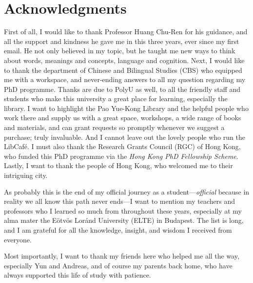 \chapter*{Acknowledgments}
\label{ch:acknowledgments}


First of all, I would like to thank Professor Huang Chu-Ren for his guidance, and all the support and kindness he gave me in this three years, ever since my first email. He not only believed in my topic, but he taught me new ways to think about words, meanings and concepts, language and cognition. Next, I would like to thank the department of Chinese and Bilingual Studies (CBS) who equipped me with a workspace, and never-ending answers to all my question regarding my PhD programme. Thanks are due to PolyU as well, to all the friendly staff and students who make this university a great place for learning, especially the library. I want to highlight the Pao Yue-Kong Library and the helpful people who work there and supply us with a great space, workshops, a wide range of books and materials, and can grant requests so promptly whenever we suggest a purchase; truly invaluable. And I cannot leave out the lovely people who run the LibCafé. I must also thank the Research Grants Council (RGC) of Hong Kong, who funded this PhD programme via the \textit{Hong Kong PhD Fellowship Scheme}. Lastly, I want to thank the people of Hong Kong, who welcomed me to their intriguing city.


As probably this is the end of my official journey as a student---\textit{official} because in reality we all know this path never ends---I want to mention my teachers and professors who I learned so much from throughout these years, especially at my alma mater the Eötvös Loránd University (ELTE) in Budapest. The list is long, and I am grateful for all the knowledge, insight, and wisdom I received from everyone.


Most importantly, I want to thank my friends here who helped me all the way, especially Yun and Andreas, and of course my parents back home, who have always supported this life of study with patience.
